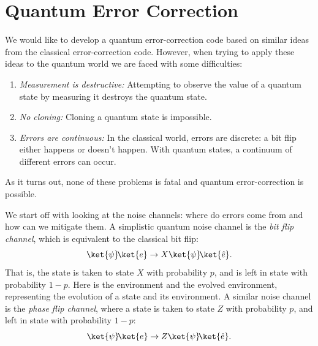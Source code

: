 \documentclass[11pt, notitlepage]{report}
\begin{document}
\section{Quantum Error Correction}
We would like to develop a quantum error-correction code based on similar ideas from the classical error-correction code. However, when trying to apply these ideas to the quantum world we are faced with some difficulties:
\begin{enumerate}
  \item \emph{Measurement is destructive:} Attempting to observe the value of a quantum state by measuring it destroys the quantum state.
  \item \emph{No cloning:} Cloning a quantum state is impossible.
  \item \emph{Errors are continuous:} In the classical world, errors are discrete: a bit flip either happens or doesn't happen. With quantum states, a continuum of different errors can occur.
\end{enumerate}
As it turns out, none of these problems is fatal and quantum error-correction is possible.

We start off with looking at the noise channels: where do errors come from and how can we mitigate them. A simplistic quantum noise channel is the \emph{bit flip channel}, which is equivalent to the classical bit flip:
\begin{equation}
  \ket{\psi}\!\ket{e} \rightarrow X\ket{\psi}\!\ket{\hat{e}}.
\end{equation}
That is, the state \ket{\psi} is taken to state $X$\ket{\psi} with probability $p$, and is left in state \ket{\psi} with probability $1 - p$. Here  is the environment and  the evolved environment, representing the evolution of a state and its environment. A similar noise channel is the \emph{phase flip channel}, where a state \ket{\psi} is taken to state $Z$\ket{\psi} with probability $p$, and left in state \ket{\psi} with probability $1 - p$:
\begin{equation}
  \ket{\psi}\!\ket{e} \rightarrow Z\ket{\psi}\!\ket{\hat{e}}.
\end{equation}
\end{document}
